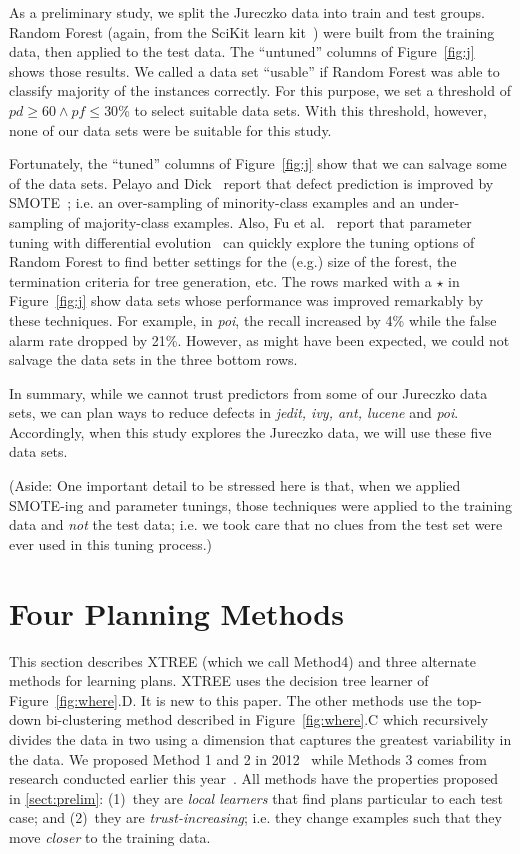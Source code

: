 \documentclass{sig-alternate}
\newcommand{\tion}[1]{\textsection\ref{sect:#1}}
\newcommand{\fig}[1]{Figure~\ref{fig:#1}}
\begin{document}
As a preliminary study, we split the Jureczko  data into train and test groups.
Random Forest (again, from the SciKit learn kit~\cite{Pedregosa2012}) were
built from the training data, then applied to the test data.
The ``untuned'' columns of \fig{j} shows those results. We called a data set ``usable'' if Random Forest was able to classify majority of the instances correctly. For this purpose, we set a threshold of $\mathit{pd}\ge 60 \wedge \mathit{pf} \le 30$\% to select suitable data sets. With this threshold, however, none of our data sets were be suitable for this study.

Fortunately, the ``tuned'' columns of \fig{j} show that we can salvage some of the data sets. Pelayo and Dick~\cite{pelayo07} report that defect prediction is improved by SMOTE~\cite{Chawla2002}; i.e. an over-sampling of minority-class examples and an under-sampling of majority-class examples. Also, Fu et al.~\cite{fu:ase15} report that parameter tuning with differential evolution~\cite{storn97} can quickly explore the tuning options of Random Forest to find better settings for the (e.g.) size of the forest, the termination criteria
for tree generation, etc. The rows \colorbox{celadon}{marked with a $\star$} in \fig{j} show data sets whose performance was improved remarkably by these techniques. For example, in {\em poi}, the recall increased by 4\% while the false alarm rate dropped by 21\%. However,  as might have been expected, we could not salvage the data sets in the  three bottom rows.

In summary, while we cannot trust predictors from some of our Jureczko data sets,
we can plan ways to reduce defects in {\em jedit, ivy, ant, lucene} and {\em poi}.
Accordingly, when this study explores the Jureczko data, we will use these five data sets.

(Aside: One important detail to be stressed here is that, when we applied    SMOTE-ing and
parameter tunings, those techniques were applied to the training data and {\em not}
the test data; i.e. we took care that no clues from the test set were ever used in this tuning process.)



 
\section{Four Planning Methods}\label{sect:planners}
 
This section describes XTREE (which we call Method4) and  three  
alternate methods for learning plans.
  XTREE  uses the decision tree learner of \fig{where}.D.  It is new to this paper.
  The other methods use the   top-down
	bi-clustering method described in \fig{where}.C  which recursively divides the
	data in two  using a dimension that captures the greatest variability in the data. 
	We proposed Method 1 and 2   in 2012~\cite{me12c} while Methods 3 comes from research conducted earlier this year~\cite{krishna15}. 
All  methods have the  properties proposed in \tion{prelim}: (1)~they are {\em local learners}
that find   plans   particular to each test case; and (2)~they  are {\em trust-increasing}; 
  i.e. they change  examples such that they move {\em closer} to the training data.
 
\end{document}
